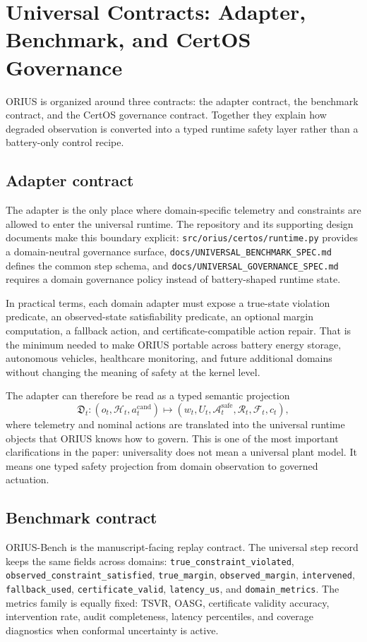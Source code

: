 \section{Universal Contracts: Adapter, Benchmark, and CertOS Governance}
\label{sec:prof-runtime-contracts}

ORIUS is organized around three contracts: the adapter contract, the
benchmark contract, and the CertOS governance contract. Together they
explain how degraded observation is converted into a typed runtime safety
layer rather than a battery-only control recipe.

\subsection{Adapter contract}
The adapter is the only place where domain-specific telemetry and
constraints are allowed to enter the universal runtime. The repository and
its supporting design documents make this boundary explicit:
\texttt{src/orius/certos/runtime.py} provides a domain-neutral governance
surface, \texttt{docs/UNIVERSAL\_BENCHMARK\_SPEC.md} defines the common
step schema, and \texttt{docs/UNIVERSAL\_GOVERNANCE\_SPEC.md} requires a
domain governance policy instead of battery-shaped runtime state.

In practical terms, each domain adapter must expose a true-state violation
predicate, an observed-state satisfiability predicate, an optional margin
computation, a fallback action, and certificate-compatible action repair.
That is the minimum needed to make ORIUS portable across battery energy
storage, autonomous vehicles, healthcare monitoring, and future additional
domains without changing the meaning of safety at the kernel level.

The adapter can therefore be read as a typed semantic projection
\[
  \mathfrak{D}_t:
  (o_t,\mathcal{H}_t,a_t^{\mathrm{cand}})
  \mapsto
  (w_t,U_t,\mathcal{A}^{\mathrm{safe}}_t,\mathcal{R}_t,\mathcal{F}_t,c_t),
\]
where telemetry and nominal actions are translated into the universal runtime objects
that ORIUS knows how to govern. This is one of the most important clarifications in the
paper: universality does not mean a universal plant model. It means one typed safety
projection from domain observation to governed actuation.

\subsection{Benchmark contract}
ORIUS-Bench is the manuscript-facing replay contract. The universal step
record keeps the same fields across domains:
\texttt{true\_constraint\_violated},
\texttt{observed\_constraint\_satisfied},
\texttt{true\_margin},
\texttt{observed\_margin},
\texttt{intervened},
\texttt{fallback\_used},
\texttt{certificate\_valid},
\texttt{latency\_us}, and
\texttt{domain\_metrics}. The metrics family is equally fixed: TSVR, OASG,
certificate validity accuracy, intervention rate, audit completeness,
latency percentiles, and coverage diagnostics when conformal uncertainty is
active.

